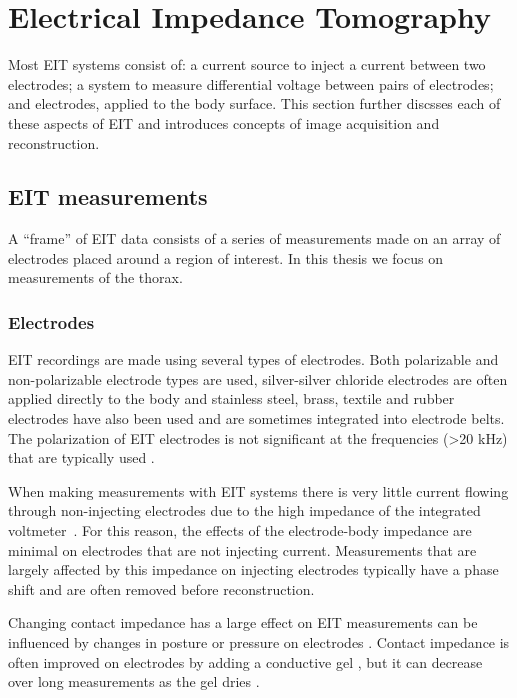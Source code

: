 \section{Electrical Impedance Tomography}

Most EIT systems consist of: 
a current source to inject a current between two electrodes;
a system to measure differential voltage between pairs of electrodes; and
electrodes, applied to the body surface.
This section further discsses each of these aspects of EIT 
and introduces concepts of image acquisition and reconstruction.


\subsection{EIT measurements}
A ``frame'' of EIT data consists of a series of measurements made on an array
of electrodes placed around
a region of interest. In this thesis we focus on measurements of the thorax. 

\subsubsection{Electrodes} \label{sec:electrodes}

EIT recordings are made using several types of electrodes. 
Both polarizable and non-polarizable
electrode types are used,
silver-silver chloride electrodes are often applied directly to the body
and stainless steel, brass, textile and rubber electrodes have also 
been used \parencite{adler_electrical_2017} and are sometimes 
integrated into electrode belts. The polarization of EIT electrodes is 
not significant at the frequencies (>20 kHz) that are typically used
\parencite{adler_electrical_2017}.

When making measurements with EIT systems there is very little current flowing
through non-injecting electrodes due to the high impedance of the 
integrated voltmeter~\parencite{holder_electrical_2004}.
For this reason, the effects of the electrode-body impedance 
are minimal on electrodes that are not injecting current. Measurements that 
are largely affected by this impedance on injecting electrodes typically have a
phase shift and are often removed before reconstruction. 

Changing contact impedance has a large effect on EIT measurements 
can be influenced by changes in posture or pressure on electrodes 
\parencite{coulombe_parametric_2005}.
Contact impedance is often improved on electrodes by adding a
conductive gel \parencite{waldmann_performance_2017}, but it can decrease 
over long measurements as the gel dries \parencite{lozano_errors_1995}. 

